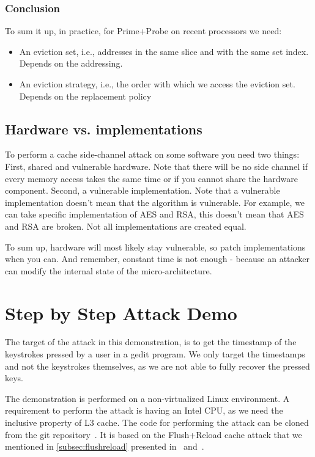\subsubsection{Conclusion}
\label{subsubsec:Conclusion}
To sum it up, in practice, for Prime+Probe on recent processors we need:
\begin{itemize}
    \item An eviction set, i.e., addresses in the same slice and with the same
    set index. Depends on the addressing.
    \item An eviction strategy, i.e., the order with which we access the
    eviction set. Depends on the replacement policy
\end{itemize}

\subsection{Hardware vs. implementations}
\label{subsec:Hardwarevsimplementations}

To perform a cache side-channel attack on some software you need two things:
First, shared and vulnerable hardware. Note that there will be no side channel
if every memory access takes the same time or if you cannot share the hardware
component. Second, a vulnerable implementation. Note that a vulnerable
implementation doesn't mean that the algorithm is vulnerable. For example, we
can take specific implementation of AES and RSA, this doesn't mean that AES and
RSA are broken. Not all implementations are created equal.

To sum up, hardware will most likely stay vulnerable, so patch implementations
when you can. And remember, constant time is not enough - because an attacker
can modify the internal state of the micro-architecture.

\section{Step by Step Attack Demo} %
\label{sec:stepbystepattack}

The target of the attack in this demonstration, is to get the timestamp of the
keystrokes pressed by a user in a gedit program. We only target the timestamps
and not the keystrokes themselves, as we are not able to fully recover the
pressed keys.

The demonstration is performed on a non-virtualized Linux environment. A
requirement to perform the attack is having an Intel CPU, as we need the
inclusive property of L3 cache. The code for performing the attack can be cloned
from the git repository~\cite{GitClementine}. It is based on the Flush+Reload
cache attack that we mentioned in \cref{subsec:flushreload} presented
in~\cite{Yarom2014} and~\cite{Gruss2015}.

